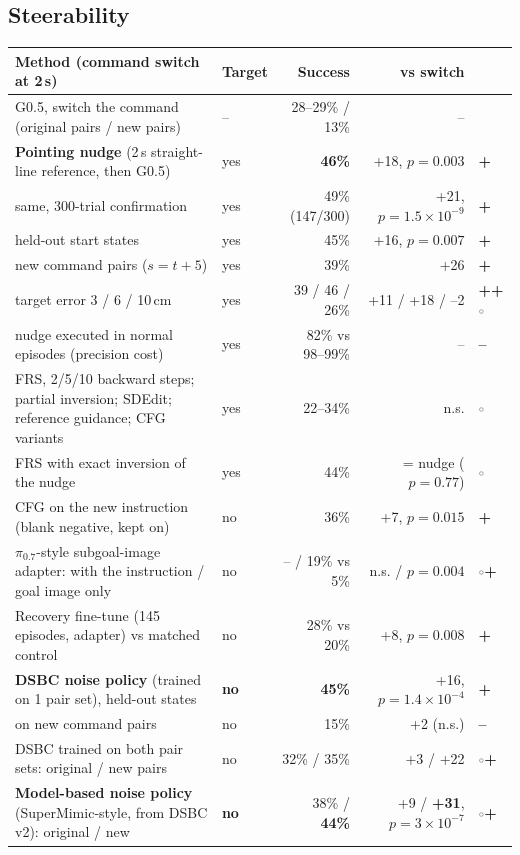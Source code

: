 \documentclass[10pt,a4paper]{article}
\newcommand{\pzs}{$\pi_{0.7}$}
\newcommand{\pos}{\textcolor{green!45!black}{\textbf{+}}}
\newcommand{\negr}{\textcolor{red!70!black}{\textbf{--}}}
\newcommand{\neu}{\textcolor{gray}{$\circ$}}
\begin{document}
\subsection{Steerability}
\label{sec:res-steer}
\begin{table}[H]\centering\small
\begin{tabularx}{\textwidth}{Ylrrl}
\toprule
Method (command switch at 2\,s) & Target & Success & vs switch & \\
\midrule
G0.5, switch the command (original pairs / new pairs) & -- & 28--29\% / 13\% & -- & \\
\textbf{Pointing nudge} (2\,s straight-line reference, then G0.5) & yes & \textbf{46\%} & +18, $p=0.003$ & \pos\\
\quad same, 300-trial confirmation & yes & 49\% (147/300) & +21, $p=1.5\times10^{-9}$ & \pos\\
\quad held-out start states & yes & 45\% & +16, $p=0.007$ & \pos\\
\quad new command pairs ($s=t{+}5$) & yes & 39\% & +26 & \pos\\
\quad target error 3 / 6 / 10\,cm & yes & 39 / 46 / 26\% & +11 / +18 / --2 & \pos\pos\neu\\
\quad nudge executed in normal episodes (precision cost) & yes & 82\% vs 98--99\% & -- & \negr\\
FRS, 2/5/10 backward steps; partial inversion; SDEdit; reference guidance; CFG variants & yes & 22--34\% & n.s. & \neu\\
FRS with exact inversion of the nudge & yes & 44\% & = nudge ($p=0.77$) & \neu\\
CFG on the new instruction (blank negative, kept on) & no & 36\% & +7, $p=0.015$ & \pos\\
\pzs-style subgoal-image adapter: with the instruction / goal image only & no & -- / 19\% vs 5\% & n.s. / $p=0.004$ & \neu\pos\\
Recovery fine-tune (145 episodes, adapter) vs matched control & no & 28\% vs 20\% & +8, $p=0.008$ & \pos\\
\textbf{DSBC noise policy} (trained on 1 pair set), held-out states & \textbf{no} & \textbf{45\%} & +16, $p=1.4\times10^{-4}$ & \pos\\
\quad on new command pairs & no & 15\% & +2 (n.s.) & \negr\\
DSBC trained on both pair sets: original / new pairs & no & 32\% / 35\% & +3 / +22 & \neu\pos\\
\textbf{Model-based noise policy} (SuperMimic-style, from DSBC v2): original / new & \textbf{no} & 38\% / \textbf{44\%} & +9 / \textbf{+31}, $p=3\times10^{-7}$ & \neu\pos\\

\end{tabularx}
\end{table}
\end{document}

